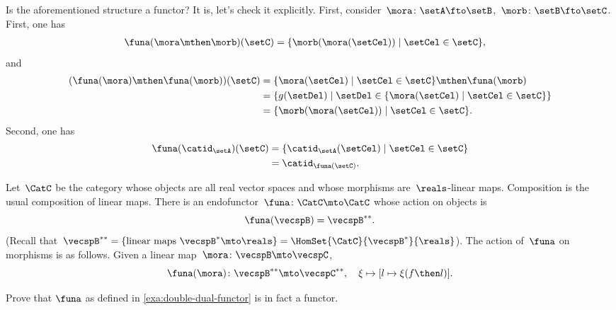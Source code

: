 \begin{example}
  Is the aforementioned structure a functor? It is, let's check it explicitly.
  First, consider~$\mora\colon \setA\fto \setB$,~$\morb\colon \setB \fto \setC$.
  First, one has
  \begin{equation*}
  \begin{aligned}
    \funa(\mora\mthen \morb)(\setC)&=\{ \morb(\mora(\setCel))\mid \setCel \in \setC\},
  \end{aligned}
  \end{equation*}
  and
  \begin{equation*}
  \begin{aligned}
    (\funa(\mora)\mthen \funa(\morb))(\setC)&=\{ \mora(\setCel) \mid \setCel \in \setC\}\mthen \funa(\morb)\\
    &=\{g(\setDel)\mid \setDel \in \{\mora(\setCel)\mid \setCel\in \setC\}\}\\
    &=\{ \morb(\mora(\setCel))\mid \setCel \in \setC\}.
  \end{aligned}
  \end{equation*}
  Second, one has
  \begin{equation*}
  \begin{aligned}
    \funa(\catid_\setA)(\setC)&= \{\catid_\setA(\setCel)\mid \setCel \in \setC\}\\
    &=\catid_{\funa(\setC)}.
  \end{aligned}
  \end{equation*}
\end{example}


\begin{example}\label{exa:double-dual-functor}
Let~$\CatC$ be the category whose objects are all real vector spaces and whose morphisms are~$\reals$-linear maps.
Composition is the usual composition of linear maps. There is an endofunctor~$\funa \colon \CatC \mto \CatC$ whose action on objects is
\begin{equation}
\funa ( \vecspB ) = \vecspB^{**}.
\end{equation}
(Recall that~$\vecspB^{**} = \{ \text{linear maps } \vecspB^* \mto \reals \} =  \HomSet{\CatC}{\vecspB^*}{\reals}$).
The action of~$\funa$ on morphisms is as follows. Given a linear map~$\mora \colon \vecspB \mto \vecspC$,
\begin{equation}
\funa ( \mora ) \colon \vecspB^{**} \mto \vecspC^{**}, \quad \xi \mapsto [ l \mapsto \xi (f \then l)].
\end{equation}
\end{example}

\begin{gradedexercise}\label{ex:DoubleDualFunctor}
Prove that $\funa$ as defined in \cref{exa:double-dual-functor} is in fact a functor.
\end{gradedexercise}

